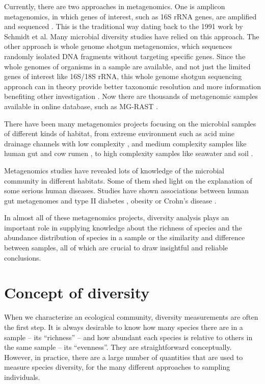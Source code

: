 Currently, there are two approaches in metagenomics. One is amplicon
metagenomics, in which genes of interest, such as 16S rRNA genes, are amplified
and sequenced \cite{Sogin:2006aa}. This is the traditional way dating back to
the 1991 work by Schmidt et al. Many microbial diversity studies have relied on
this approach. The other approach is whole genome shotgun metagenomics, which
sequences randomly isolated DNA fragments without targeting specific genes.
Since the whole genomes of organisms in a sample are available, and not just
the limited genes of interest like 16S/18S rRNA, this whole genome shotgun
sequencing approach can in theory provide better taxonomic resolution and more
information benefiting other investigation \cite{Tyson:2004aa}
\cite{Qin:2010aa}.  Now there are thousands of metagenomic samples available in
online database, such as MG-RAST \cite{Glass:2010aa}.

There have been many metagenomics projects focusing on the microbial samples of
different kinds of habitat, from extreme environment such as acid mine drainage
channels with low complexity \cite{Tyson:2004aa}, and medium complexity samples
like human gut \cite{Qin:2010aa} and cow rumen \cite{Hess:2011aa}, to high
complexity samples like seawater \cite{Venter:2004aa} and soil
\cite{Gilbert:2010aa}.

Metagenomics studies have revealed lots of knowledge of the microbial community in
different habitats. Some of them shed light on the explanation of some serious
human diseases. Studies have shown associations between human gut metagenomes
and type II diabetes \cite{Qin:2012aa}, obesity \cite{Turnbaugh:2009aa,
Kau:2011aa} or Crohn's disease \cite{Morgan:2012aa}.

In almost all of these metagenomics projects, diversity analysis plays an
important role in supplying knowledge about the richness of species and the
abundance distribution of species in a sample or the similarity and difference
between samples, all of which are crucial to draw insightful and reliable
conclusions.




\section{Concept of diversity} When we characterize an ecological community,
diversity measurements are often the first step. It is always desirable to know
how many species there are in a sample -- its ``richness'' -- and how abundant
each species is relative to others in the same sample -- its ``evenness''. They
are straightforward conceptually. However, in practice, there are a large number of
quantities that are used to measure species diversity, for the many different
approaches to sampling individuals.

